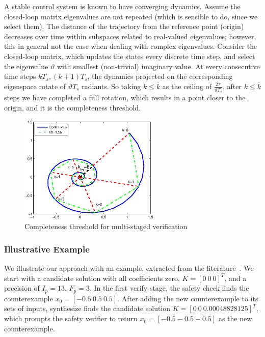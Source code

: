 \documentclass[runningheads,a4paper]{llncs}
\begin{document}
\begin{enumerate}
A stable control system is known to have converging dynamics.  Assume the
closed-loop matrix eigenvalues are not repeated (which is sensible to do,
since we select them).  The distance of the trajectory from the reference
point (origin) decreases over time within subspaces related to real-valued
eigenvalues; however, this in general not the case when dealing with complex
eigenvalues.  Consider the closed-loop matrix, which updates the states
every discrete time step, and select the eigenvalue $\vartheta$ with
smallest (non-trivial) imaginary value.  At every consecutive time steps
$kT_s, (k+1)T_s$, the dynamics projected on the corresponding eigenspace
rotate of $\vartheta T_s$ radiants.  So taking $k{\leq}\overline{k}$ as the
ceiling of $\frac{2\pi}{\vartheta T_s}$, after $k{\leq}\overline{k}$ steps
we have completed a full rotation, which results in a point closer to the
origin, and it is the completeness threshold.

\begin{figure}[t]
\centering
\includegraphics[width=0.6\textwidth]{ct.eps}
\vspace{0.1cm}
\caption{Completeness threshold for multi-staged verification}
\label{fig:ct}
\end{figure}

\end{enumerate}

\subsubsection{Illustrative Example} \label{sec:running-ex}

We illustrate our approach with an example,
extracted from the literature~\cite{Franklin15}.
%
We start with a candidate solution with all coefficients zero, $K=[0
  \ 0 \ 0]^T$, and a precision of $I_p=13$, $F_p=3$.  In the first
{\sc verify} stage, the {\sc safety} check finds the counterexample
%
$ x_0 = [-0.5 \ 0.5 \ 0.5] $.
%
After adding the new counterexample to its sets of {\sc inputs}, {\sc
  synthesize} finds the candidate solution $K=[0 \ 0
  \ 0.00048828125]^T$, which prompts the {\sc safety} verifier to
return $x_0=[-0.5 -0.5 -0.5]$ as the new counterexample.
\end{document}
